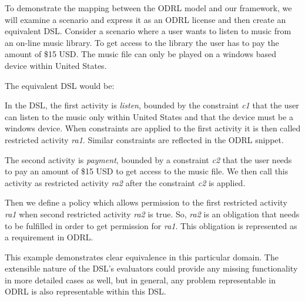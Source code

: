 To demonstrate the mapping between the ODRL model and our framework, we will examine a scenario and express it as an ODRL license and then create an equivalent DSL. Consider a scenario where a user wants to listen to music from an on-line music library. To get access to the library the user has to pay the amount of \$15 USD. The music file can only be played on a windows based device within United States.



The equivalent DSL would be:



In the DSL, the first activity is \emph{listen}, bounded by the constraint {\em c1} that the user can listen to the music only within United States and that the device must be a windows device. When constraints are applied to the first activity it is then called restricted activity {\em ra1}. Similar constraints are reflected in the ODRL snippet.

The second activity is \emph{payment}, bounded by a constraint {\em c2} that the user needs to pay an amount of \$15 USD to get access to the music file. We then call this activity as restricted activity {\em ra2} after the constraint {\em c2} is applied. 

Then we define a policy which allows permission to the first restricted activity {\em ra1} when second restricted activity {\em ra2} is true. So, {\em ra2} is an obligation that needs to be fulfilled in order to get permission for {\em ra1}. This obligation is represented as a requirement in ODRL.

This example demonstrates clear equivalence in this particular domain.  The extensible nature of the DSL's evaluators could provide any missing functionality in more detailed cases as well, but in general, any problem representable in ODRL is also representable within this DSL.